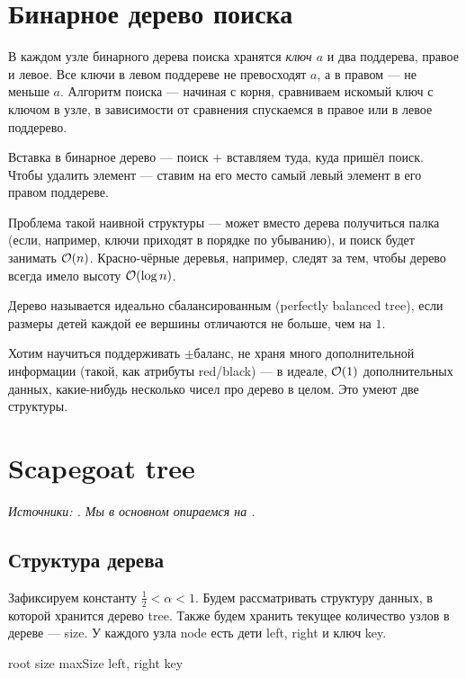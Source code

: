 \section{Бинарное дерево поиска}

В каждом узле бинарного дерева поиска хранятся {\it ключ $a$} и два поддерева, правое и левое. Все ключи в левом поддереве не превосходят $a$, а в правом — не меньше $a$. Алгоритм поиска — начиная с корня, сравниваем искомый ключ с ключом в узле, в зависимости от сравнения спускаемся в правое или в левое поддерево.

Вставка в бинарное дерево — поиск $+$ вставляем туда, куда пришёл поиск. Чтобы удалить элемент --- ставим на его место самый левый элемент в его правом поддереве.

Проблема такой наивной структуры — может вместо дерева получиться палка (если, например, ключи приходят в порядке по убыванию), и поиск будет занимать $\mathcal{O}(n)$. Красно-чёрные деревья, например, следят за тем, чтобы дерево всегда имело высоту $\mathcal{O}(\log n)$.

\begin{definition}
	Дерево называется идеально сбалансированным (perfectly balanced tree), если размеры детей каждой ее вершины отличаются не больше, чем на $1$.
\end{definition}

Хотим научиться поддерживать $\pm$баланс, не храня много дополнительной информации (такой, как атрибуты red/black) — в идеале, $\mathcal{O}(1)$ дополнительных данных, какие-нибудь несколько чисел про дерево в целом. Это умеют две структуры.

\section{Scapegoat tree}

 {\it Источники: \cite{galperin1993scapegoat,andersson1989improving}. Мы в основном опираемся на \cite{galperin1993scapegoat}.}

 \subsection{Структура дерева}

Зафиксируем константу $\frac{1}{2} < \alpha < 1$. Будем рассматривать структуру данных, в которой хранится дерево tree. Также будем хранить текущее количество узлов в дереве — size. У каждого узла node есть дети left, right и ключ key.

\begin{algorithmic}[0]
	\algrenewcommand{}
		\State root
		\State size
		\State maxSize
	\EndProcedure
		\State left, right
		\State key
	\EndProcedure
\end{algorithmic}

